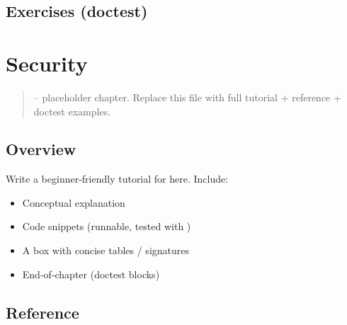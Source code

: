 \documentclass[a4paper,11pt,english]{sphinxmanual}
\begin{document}
\subsection{Exercises (doctest)}
\label{\detokenize{best_practices/project_layout:exercises-doctest}}
\begin{sphinxVerbatim}[commandchars=\\\{\}]
\end{sphinxVerbatim}

\sphinxstepscope


\section{Security}
\label{\detokenize{best_practices/security:security}}\label{\detokenize{best_practices/security::doc}}\begin{quote}

\sphinxAtStartPar
{} – placeholder chapter. Replace this file with full tutorial + reference + doctest examples.
\end{quote}


\subsection{Overview}
\label{\detokenize{best_practices/security:overview}}
\sphinxAtStartPar
Write a beginner‑friendly tutorial for  here. Include:
\begin{itemize}
\item {} 
\sphinxAtStartPar
Conceptual explanation

\item {} 
\sphinxAtStartPar
Code snippets (runnable, tested with )

\item {} 
\sphinxAtStartPar
A  box with concise tables / signatures

\item {} 
\sphinxAtStartPar
End‑of‑chapter  (doctest blocks)

\end{itemize}


\subsection{Reference}
\label{\detokenize{best_practices/security:reference}}
\end{document}
